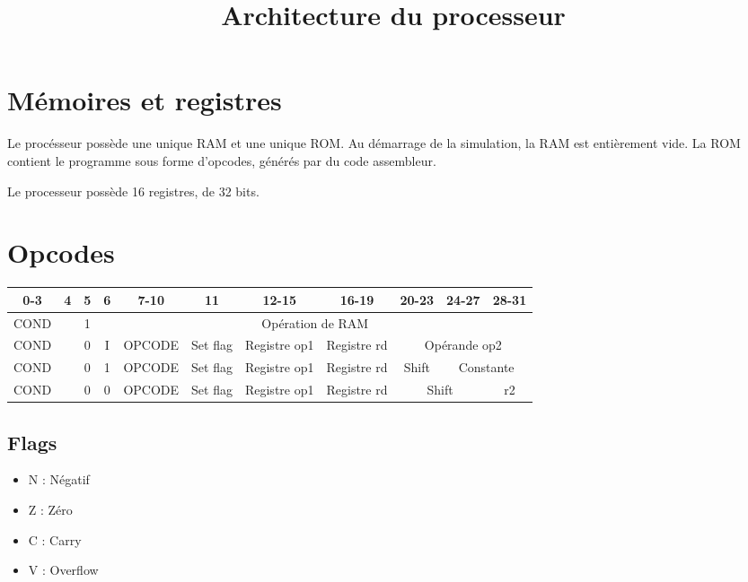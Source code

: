 \documentclass[a4paper]{article}
\title{Architecture du processeur}
\begin{document}
\maketitle

\section{Mémoires et registres}

Le procésseur possède une unique RAM et une unique ROM. Au démarrage de la
simulation, la RAM est entièrement vide. La ROM contient le programme sous forme
d'opcodes, générés par du code assembleur.

Le processeur possède 16 registres, de 32 bits.

\section{Opcodes}
\begin{tabular}{|c|c|c|c|c|c|c|c|c|c|c|}
  \hline
  0-3  & 4 & 5 & 6 & 7-10 & 11 & 12-15 & 16-19 & 20-23 & 24-27 & 28-31 \\
  \hline
  COND &   & 1 & \multicolumn{8}{c|}{Opération de RAM} \\
  \hline
  COND &   & 0 & I & OPCODE & Set flag & Registre op1 & Registre rd & \multicolumn{3}{c|}{Opérande op2}  \\
  \hline
  COND &   & 0 & 1 & OPCODE & Set flag & Registre op1 & Registre rd & Shift & \multicolumn{2}{c|}{Constante} \\
  \hline
  COND &   & 0 & 0 & OPCODE & Set flag & Registre op1 & Registre rd & \multicolumn{2}{c|}{Shift} & r2  \\
  \hline
\end{tabular}

\subsection{Flags}

  \begin{itemize}
  \item N : Négatif
  \item Z : Zéro
  \item C : Carry
  \item V : Overflow
  \end{itemize}
\end{document}
